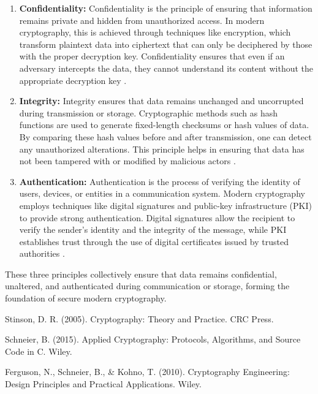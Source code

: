 \documentclass{article}
\begin{document}
\begin{enumerate}[label=\alph*)]
    \item \textbf{Confidentiality:} Confidentiality is the principle of ensuring that information remains private and hidden from unauthorized access. In modern cryptography, this is achieved through techniques like encryption, which transform plaintext data into ciphertext that can only be deciphered by those with the proper decryption key. Confidentiality ensures that even if an adversary intercepts the data, they cannot understand its content without the appropriate decryption key \cite{stinson2005cryptography}.

    \item \textbf{Integrity:} Integrity ensures that data remains unchanged and uncorrupted during transmission or storage. Cryptographic methods such as hash functions are used to generate fixed-length checksums or hash values of data. By comparing these hash values before and after transmission, one can detect any unauthorized alterations. This principle helps in ensuring that data has not been tampered with or modified by malicious actors \cite{schneier2015applied}.

    \item \textbf{Authentication:} Authentication is the process of verifying the identity of users, devices, or entities in a communication system. Modern cryptography employs techniques like digital signatures and public-key infrastructure (PKI) to provide strong authentication. Digital signatures allow the recipient to verify the sender's identity and the integrity of the message, while PKI establishes trust through the use of digital certificates issued by trusted authorities \cite{ferguson2010cryptography}.
\end{enumerate}

These three principles collectively ensure that data remains confidential, unaltered, and authenticated during communication or storage, forming the foundation of secure modern cryptography.

\begin{thebibliography}{9}
     Stinson, D. R. (2005). Cryptography: Theory and Practice. CRC Press.
    
     Schneier, B. (2015). Applied Cryptography: Protocols, Algorithms, and Source Code in C. Wiley.

     Ferguson, N., Schneier, B., & Kohno, T. (2010). Cryptography Engineering: Design Principles and Practical Applications. Wiley.
\end{thebibliography}
\end{document}
